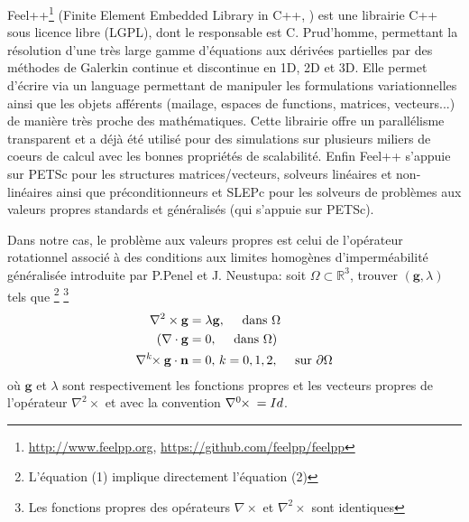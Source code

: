 \documentclass[12pt]{article}
\newcommand{\curlk}[1][k]{\ensuremath{\nabla^{#1}\hspace{-.3em}\times}\xspace}
\begin{document}
Feel++\footnote{\url{http://www.feelpp.org}, \url{https://github.com/feelpp/feelpp}} (Finite Element Embedded Library in
C++, \cite{prud2012feel++,feelpp098:10046} ) est une librairie C++ sous licence
libre (LGPL), dont le responsable est C. Prud'homme, permettant la résolution
d'une très large gamme d'équations aux dérivées partielles par des méthodes de
Galerkin continue et discontinue en 1D, 2D et 3D. Elle permet d'écrire via un
language permettant de manipuler les formulations variationnelles ainsi que les
objets afférents (mailage, espaces de functions, matrices, vecteurs...) de
manière très proche des mathématiques. Cette librairie offre un parallélisme
transparent et a déjà été utilisé pour des simulations sur plusieurs miliers de
coeurs de calcul avec les bonnes propriétés de scalabilité. Enfin Feel++
s'appuie sur PETSc pour les structures matrices/vecteurs, solveurs linéaires et
non-linéaires ainsi que préconditionneurs et SLEPc pour les solveurs de
problèmes aux valeurs propres standards et généralisés (qui s'appuie sur PETSc).

Dans notre cas, le problème aux valeurs propres est celui de l'opérateur rotationnel 
associé à des conditions aux limites homogènes d'imperméabilité généralisée introduite 
par P.Penel et J. Neustupa\cite{Penel2004}: soit
$\Omega \subset \mathbb{R}^3$, trouver $(\mathbf{g},\lambda)$ tels que
\footnote{L'équation (1) implique directement l'équation (2)}
\footnote{Les fonctions propres des opérateurs $\nabla \times$ et $\nabla^2 \times$
sont identiques}
\begin{align}
\label{eq:0}
\nabla^2 \times \mathbf{g} &= \lambda \mathbf{g},\quad \mbox{ dans } \Omega\\
(\nabla \cdot \mathbf{g} &= 0,\quad \mbox{ dans } \Omega )\\
\curlk{} \mathbf{g} \cdot \mathbf{n} &= 0,\, k=0,1,2,\quad \mbox{ sur
} \partial \Omega
\end{align}
où $\mathbf{g}$ et $\lambda$ sont respectivement les fonctions propres et les
 vecteurs propres de l'opérateur $\nabla^2 \times$ et avec la convention 
$\curlk[0]{} = Id$.
\end{document}
